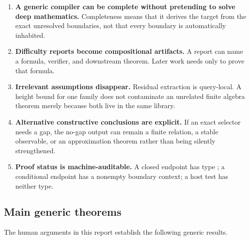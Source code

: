 \begin{enumerate}
\item \textbf{A generic compiler can be complete without pretending to solve deep mathematics.}  Completeness means that it derives the target from the exact unresolved boundaries, not that every boundary is automatically inhabited.
\item \textbf{Difficulty reports become compositional artifacts.}  A report can name a formula, verifier, and downstream theorem.  Later work needs only to prove that formula.
\item \textbf{Irrelevant assumptions disappear.}  Residual extraction is query-local.  A height bound for one family does not contaminate an unrelated finite algebra theorem merely because both live in the same library.
\item \textbf{Alternative constructive conclusions are explicit.}  If an exact selector needs a gap, the no-gap output can remain a finite relation, a stable observable, or an approximation theorem rather than being silently strengthened.
\item \textbf{Proof status is machine-auditable.}  A closed endpoint has type ; a conditional endpoint has a nonempty boundary context; a host test has neither type.
\end{enumerate}

\subsection{Main generic theorems}

The human arguments in this report establish the following generic results.

